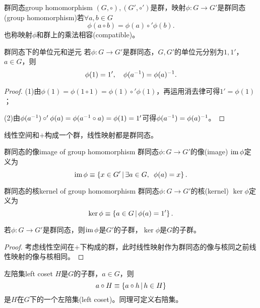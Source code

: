 \begin{definition}{群同态}{group homomorphism}
	$(G,\circ),(G',\circ')$是群，映射$\phi:G\to G'$是群同态(group homomorphism)若$\forall a,b\in G$
	\begin{equation}
		\phi(a\circ b)=\phi(a)\circ'\phi(b).
	\end{equation}
	也称映射$\phi$和群上的乘法相容(compatible)。
\end{definition}
\begin{theorem}{群同态下的单位元和逆元}{}
	若$\phi:G\to G'$是群同态，$G,G'$的单位元分别为$1,1'$，$a\in G$，则
	\begin{equation}
		\phi(1)=1',\quad \phi(a^{-1})=\phi(a)^{-1}.
	\end{equation}
\end{theorem}
\begin{proof}
	(1)由$\phi(1)=\phi(1\circ 1)=\phi(1)\circ'\phi(1)$，再运用消去律可得$1'=\phi(1)$；

	(2)由$\phi(a^{-1})\circ'\phi(a)=\phi(a^{-1}\circ a)=\phi(1)=1'$可得$\phi(a^{-1})=\phi(a)^{-1}$。
\end{proof}
\begin{example}
	线性空间和$+$构成一个群，线性映射都是群同态。
\end{example}
\begin{definition}{群同态的像}{image of group homomorphism}
	群同态$\phi:G\to G'$的像(image) $\operatorname{im}\phi$定义为
	\begin{equation}
		\operatorname{im}\phi\equiv\left\{x\in G'\,\middle\vert\,\exists a\in G,\enspace\phi(a)=x\right\}.
	\end{equation}
\end{definition}
\begin{definition}{群同态的核}{kernel of group homomorphism}
	群同态$\phi:G\to G'$的核(kernel) $\ker\phi$定义为
	\begin{equation}
		\ker\phi\equiv\left\{a\in G\,\middle\vert\,\phi(a)=1'\right\}.
	\end{equation}
\end{definition}
\begin{theorem}{}{}
	若$\phi:G\to G'$是群同态，则$\operatorname{im}\phi$是$G'$的子群，$\ker\phi$是$G$的子群。
\end{theorem}
\begin{proof}
	考虑线性空间在$+$下构成的群，此时线性映射作为群同态的像与核同之前线性映射的像与核相同。
\end{proof}
\begin{definition}{左陪集}{left coset}
	$H$是$G$的子群，$a\in G$，则
	\begin{equation}
		a\circ H\equiv\left\{a\circ h\,\middle\vert\,h\in H\right\}
	\end{equation}
	是$H$在$G$下的一个左陪集(left coset)。同理可定义右陪集。
\end{definition}
